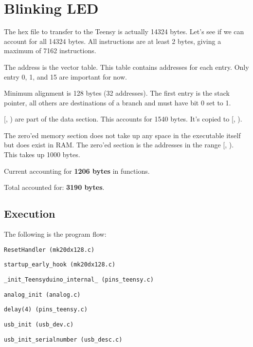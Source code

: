 \newpage
\section{Blinking LED}

The hex file to transfer to the Teensy is actually 14324 bytes.
Let's see if we can account for all 14324 bytes.
All instructions are at least 2 bytes, giving a maximum of 7162 instructions.

The address  is the vector table. This table contains
addresses for each entry. Only entry 0, 1, and 15 are important for now.

Minimum alignment is 128 bytes (32 addresses). The first entry is the stack
pointer, all others are destinations of a branch and must have bit 0 set to 1.

[, ) are part of the data
section. This accounts for 1540 bytes. It's copied to
[, ).

The zero'ed memory section does not take up any space in the executable itself
but does exist in RAM. The zero'ed section is the addresses in the range
[, ).
This takes up 1000 bytes.

Current accounting for \textbf{1206 bytes} in functions.

Total accounted for: \textbf{3190 bytes}.

\subsection{Execution}

The following is the program flow:

\indent \texttt{ResetHandler (mk20dx128.c)}

\hspace{2mm} \texttt{startup\_early\_hook (mk20dx128.c)}

\hspace{2mm} \texttt{\_init\_Teensyduino\_internal\_ (pins\_teensy.c)}

\hspace{4mm} \texttt{analog\_init (analog.c)}

\hspace{4mm} \texttt{delay(4) (pins\_teensy.c)}

\hspace{4mm} \texttt{usb\_init (usb\_dev.c)}

\hspace{6mm} \texttt{usb\_init\_serialnumber (usb\_desc.c)}

